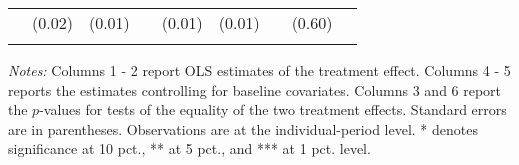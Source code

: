 \begin{table}[htbp]
{\begin{threeparttable}
\begin{tabular}{l*{8}{c}}
          &   (0.02)&   (0.01)&         &   (0.01)&   (0.01)&         &   (0.60)&         \\
          &         &         &         &         &         &         &         &         \\
\bottomrule \end{tabular} \begin{tablenotes}[flushleft] \footnotesize \item \emph{Notes:} Columns 1 - 2 report OLS estimates of the treatment effect. Columns 4 - 5 reports the estimates controlling for baseline covariates. Columns 3 and 6 report the \(p\)-values for tests of the equality of the two treatment effects. Standard errors are in parentheses. Observations are at the individual-period level. * denotes significance at 10 pct., ** at 5 pct., and *** at 1 pct. level. \end{tablenotes} \end{threeparttable} } \end{table}

